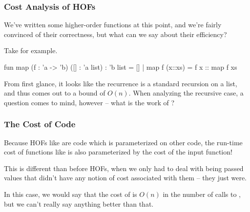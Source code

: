 \documentclass[aspectratio=169]{beamer}
\begin{document}
\begin{frame}[fragile]
  \frametitle{Cost Analysis of HOFs}

  We've written some higher-order functions at this point, and we're fairly convinced
  of their correctness, but what can we say about their efficiency?

  \pause
  \vspace{\fill}

  Take  for example.

  \pause
  \vspace{\fill}

  \begin{codeblock}
    fun map (f : 'a -> 'b) ([] : 'a list) : 'b list = []
      | map f (x::xs) = f x :: map f xs
  \end{codeblock}

  \pause
  \vspace{\fill}

  From first glance, it looks like the recurrence is a standard recursion on a list,
  and thus comes out to a bound of $O(n)$. When analyzing the recursive case, a question
  comes to mind, however -- what is the work of ?
\end{frame}

\begin{frame}[fragile]
  \frametitle{The Cost of Code}

  \ptmt

  Because HOFs like  are code which is parameterized on other code,
  the run-time cost of functions like  is also parameterized by
  the cost of the input function!

  \pause
  \vspace{\fill}

  This is different than before HOFs, when we only had to deal with being passed
  values that didn't have any notion of cost associated with them -- they just were.

  \pause
  \vspace{\fill}

  In this case, we would say that the cost of  is $O(n)$ in the number of
  calls to , but we can't really say anything better than that.
\end{frame}

\end{document}
